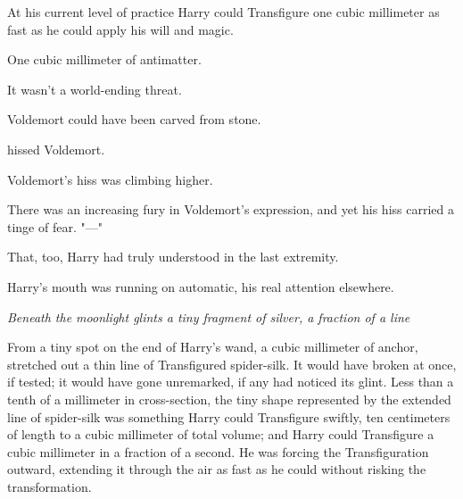 At his current level of practice Harry could Transfigure one cubic millimeter
as fast as he could apply his will and magic.

One cubic millimeter of antimatter.

It wasn't a world-ending threat.

Voldemort could have been carved from stone. 


 hissed Voldemort. 


 Voldemort's hiss was climbing
higher.


There was an increasing fury in Voldemort's expression, and yet his hiss
carried a tinge of fear. "\mbox{---}"

 That, too, Harry had truly understood in the last extremity.

Harry's mouth was running on automatic, his real attention elsewhere.

\emph{Beneath the moonlight glints a tiny fragment of silver, a fraction of a
line{\el}}

From a tiny spot on the end of Harry's wand, a cubic millimeter of anchor,
stretched out a thin line of Transfigured spider-silk. It would have broken at
once, if tested; it would have gone unremarked, if any had noticed its glint.
Less than a tenth of a millimeter in cross-section, the tiny shape represented
by the extended line of spider-silk was something Harry could Transfigure
swiftly, ten centimeters of length to a cubic millimeter of total volume; and
Harry could Transfigure a cubic millimeter in a fraction of a second. He was
forcing the Transfiguration outward, extending it through the air as fast as he
could without risking the transformation.

